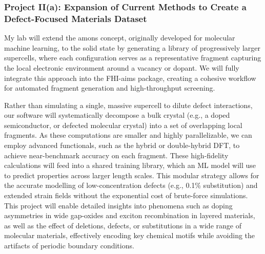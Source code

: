 \documentclass[11pt,letterpaper]{article}
\begin{document}
\subsubsection*{Project II(a): Expansion of Current Methods to Create a Defect-Focused Materials Dataset}  

My lab will extend the amons concept, originally developed for molecular machine learning, to the solid state by generating a library of progressively larger supercells, where each configuration serves as a representative fragment capturing the local electronic environment around a vacancy or dopant. We will fully integrate this approach into the FHI-aims package\cite{fhiaims}, creating a cohesive workflow for automated fragment generation and high-throughput screening.

Rather than simulating a single, massive supercell to dilute defect interactions, our software will systematically decompose a bulk crystal (e.g., a doped semiconductor, or defected molecular crystal) into a set of overlapping local fragments. As these computations are smaller and highly parallelizable, we can employ advanced functionals, such as the hybrid or double-hybrid DFT, to achieve near-benchmark accuracy on each fragment. These high-fidelity calculations will feed into a shared training library, which an ML model will use to predict properties across larger length scales. This modular strategy allows for the accurate modelling of low-concentration defects (e.g., 0.1\% substitution) and extended strain fields without the exponential cost of brute-force simulations. This project will enable detailed insights into phenomena such as doping asymmetries in wide gap-oxides and exciton recombination in layered materials, as well as the effect of deletions, defects, or substitutions in a wide range of molecular materials, effectively encoding key chemical motifs while avoiding the artifacts of periodic boundary conditions.   

\end{document}

